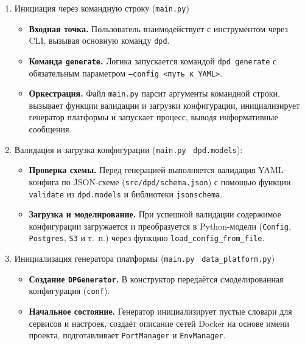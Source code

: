 \begin{enumerate}[1.]

    \item Инициация через командную строку (\texttt{main.py})
          \begin{itemize}
              \item \textbf{Входная точка.} Пользователь взаимодействует с инструментом через CLI, вызывая основную команду \texttt{dpd}.
              \item \textbf{Команда \texttt{generate}.} Логика запускается командой
                    \texttt{dpd generate} с обязательным параметром
                    \texttt{--config <путь\_к\_YAML>}.
              \item \textbf{Оркестрация.} Файл \texttt{main.py} парсит аргументы командной строки, вызывает функции валидации и загрузки конфигурации, инициализирует генератор платформы и запускает процесс, выводя информативные сообщения.
          \end{itemize}

    \item Валидация и загрузка конфигурации (\texttt{main.py} \textrightarrow\ \texttt{dpd.models}):
          \begin{itemize}
              \item \textbf{Проверка схемы.} Перед генерацией выполняется валидация YAML-конфига по JSON-схеме (\texttt{src/dpd/schema.json}) с помощью функции \texttt{validate} из \texttt{dpd.models} и библиотеки \texttt{jsonschema}.
              \item \textbf{Загрузка и моделирование.} При успешной валидации содержимое конфигурации загружается и преобразуется в Python-модели (\texttt{Config}, \texttt{Postgres}, \texttt{S3} и т.~п.) через функцию \texttt{load\_config\_from\_file}.
          \end{itemize}

    \item Инициализация генератора платформы (\texttt{main.py} \textrightarrow\ \texttt{data\_platform.py})
          \begin{itemize}
              \item \textbf{Создание \texttt{DPGenerator}.} В конструктор передаётся смоделированная конфигурация (\texttt{conf}).
              \item \textbf{Начальное состояние.} Генератор инициализирует пустые словари для сервисов и настроек, создаёт описание сетей Docker на основе имени проекта, подготавливает \texttt{PortManager} и \texttt{EnvManager}.
          \end{itemize}


\end{enumerate}
